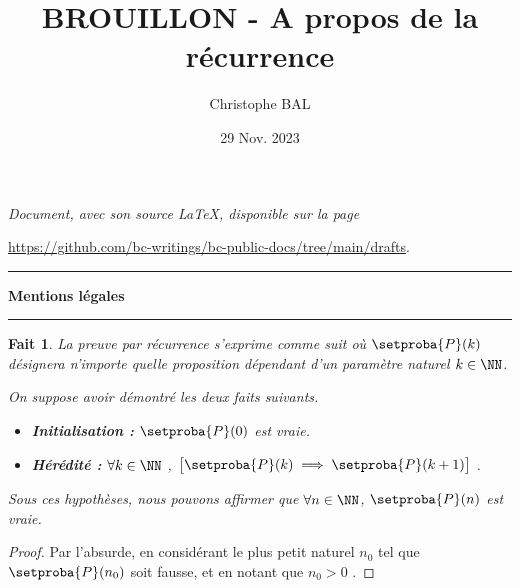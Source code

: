 \documentclass[12pt]{amsart}
\newtheorem{fact}{Fait}[section]
\begin{document}
\title{BROUILLON - A propos de la récurrence}
\author{Christophe BAL}
\date{29 Nov. 2023}

\maketitle

\begin{center}
	\itshape
	Document, avec son source \LaTeX, disponible sur la page

	\url{https://github.com/bc-writings/bc-public-docs/tree/main/drafts}.
\end{center}


\bigskip


\begin{center}
	\hrule\vspace{.3em}
	{
		\fontsize{1.35em}{1em}\selectfont
		\textbf{Mentions \og légales \fg}
	}

	\vspace{0.45em}
	\doclicenseThis
	\hrule
\end{center}


\bigskip




\begin{fact} \label{recursivity}
	La preuve par récurrence s'exprime comme suit où $\setproba{P}(k)$ désignera n'importe quelle proposition dépendant d'un paramètre naturel $k \in \NN$.

	\medskip

	On suppose avoir démontré les deux faits suivants.

	\begin{itemize}[label=\small\textbullet]
		\item \textbf{Initialisation :}
		      $\setproba{P}(0)$ est vraie.

		\item \textbf{Hérédité :}
		      $\forall k \in \NN$ , $\big[ \setproba{P}(k) \implies \setproba{P}(k+1) \big]$ .
	\end{itemize}

	Sous ces hypothèses, nous pouvons affirmer que $\forall n \in \NN$, $\setproba{P}(n)$ est vraie.
\end{fact}


\begin{proof}
	Par l'absurde, en considérant le plus petit naturel $n_0$ tel que $\setproba{P}(n_0)$ soit fausse, et en notant que $n_0 > 0$ .
\end{proof}
\end{document}
